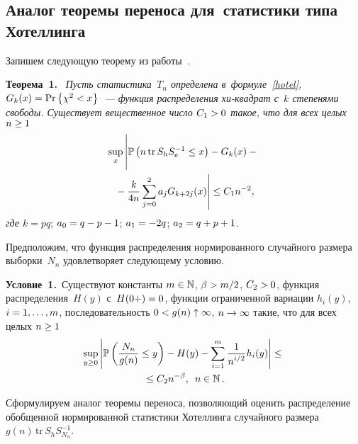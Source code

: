 \begin{multicols}{2}
\section{Аналог теоремы переноса для~статистики типа Хотеллинга}

Запишем следующую теорему из работы~\cite[теорема 4.1]{FUS05}.

\smallskip

\noindent
\textbf{Теорема~1.}\
\textit{Пусть статистика~$T_n$ определена в~формуле~\eqref{hotel}, $ G_k(x)\hm=\mathrm{Pr}\left \{ \chi 
^2 < x \right\} $~--- функция распределения хи-квад\-рат с~$k$ степенями свободы. 
Существует вещественное число $C_1 \hm> 0$ такое, что для всех целых $n \hm\geq 1$}
\begin{multline}
\label{con1}
\sup\limits_x\left\vert 
\vphantom{\sum\limits_{j=0}^2}
\mathbb{P}\left(n\,\mathrm{tr}\,S_h S_e^{-1} \leq x \right) - G_k(x) - {}\right.\\
\left.{}-
\fr{k}{4n}\sum\limits_{j=0}^2 a_j G_{k+2j}(x)\right\vert \leq C_1 n^{-2},
\end{multline}
\textit{где $k=pq$}; $a_0\hm=q\hm-p\hm-1$; $a_1\hm=-2q$; $a_2\hm=q\hm+p\hm+1$.

\smallskip


Предположим, что функция распределения нормированного случайного размера выборки~$N_n$ 
удовлетворяет следующему условию.

\smallskip

\noindent
\textbf{Условие~1.}\ {Существуют константы $m \hm\in \mathbb{N}$, $\beta \hm> m/2$, $C_2 \hm> 
0$, функция распределения~$H(y)$ с~$H(0+)\hm = 0$, функции ограниченной вариации 
$h_i(y)$, $i\hm=1, \ldots, m$, последовательность $0\hm<g(n) \uparrow \infty$, $n 
\hm\rightarrow \infty$ такие, что для всех целых $n \hm\geq 1$}
\begin{multline}
\label{con2}
\sup\limits_{y \geq 0} \left\vert \mathbb{P}\left( \displaystyle\frac{\displaystyle N_n\mathstrut}{\displaystyle g(n)\mathstrut} \leq y\right) - H(y) - 
\sum\limits_{i=1}^{m}\displaystyle\frac{\displaystyle 1\mathstrut}{\displaystyle n^{i/2}\mathstrut} h_i(y) \right\vert  \leq{}\\
{}\leq C_2 n^{- \beta},\enskip
 n \in \mathbb{N}\,.
\end{multline}

Сформулируем аналог теоремы переноса, позволяющий оценить распределение 
обобщенной нормированной статистики Хотеллинга случайного размера $g(n) 
\,\mathrm{tr}\, S_h S^{-1}_{N_n}$.

\smallskip


\end{multicols}
